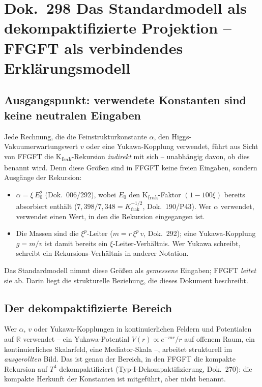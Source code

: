 
\section*{Dok.~298 \quad Das Standardmodell als dekompaktifizierte
Projektion -- FFGFT als verbindendes Erklärungsmodell}

\subsection*{Ausgangspunkt: verwendete Konstanten sind keine neutralen Eingaben}

Jede Rechnung, die die Feinstrukturkonstante $\alpha$, den Higgs-Vakuumerwartungswert
$v$ oder eine Yukawa-Kopplung verwendet, führt aus Sicht von FFGFT die
K\textsubscript{frak}-Rekursion \emph{indirekt} mit sich -- unabhängig davon,
ob dies benannt wird. Denn diese Größen sind in FFGFT keine freien Eingaben,
sondern Ausgänge der Rekursion:

\begin{itemize}
  \item $\alpha = \xi\,E_0^2$ (Dok.~006/292), wobei $E_0$ den
    K\textsubscript{frak}-Faktor $(1-100\xi)$ bereits absorbiert enthält
    ($7{,}398/7{,}348 = K_{\text{frak}}^{-1/2}$, Dok.~190/P43). Wer $\alpha$
    verwendet, verwendet einen Wert, in den die Rekursion eingegangen ist.
  \item Die Massen sind die $\xi^p$-Leiter ($m = r\,\xi^p\,v$, Dok.~292); eine
    Yukawa-Kopplung $g = m/v$ ist damit bereits ein $\xi$-Leiter-Verhältnis.
    Wer Yukawa schreibt, schreibt ein Rekursions-Verhältnis in anderer
    Notation.
\end{itemize}

Das Standardmodell nimmt diese Größen als \emph{gemessene} Eingaben; FFGFT
\emph{leitet} sie ab. Darin liegt die strukturelle Beziehung, die dieses
Dokument beschreibt.

\subsection*{Der dekompaktifizierte Bereich}

Wer $\alpha$, $v$ oder Yukawa-Kopplungen in kontinuierlichen Feldern und
Potentialen auf $\mathbb{R}$ verwendet -- ein Yukawa-Potential $V(r) \propto
e^{-mr}/r$ auf offenem Raum, ein kontinuierliches Skalarfeld, eine
Mediator-Skala --, arbeitet strukturell im \emph{ausgerollten} Bild. Das ist
genau der Bereich, in den FFGFT die kompakte Rekursion auf $T^4$
dekompaktifiziert (Typ-I-Dekompaktifizierung, Dok.~270): die kompakte
Herkunft der Konstanten ist mitgeführt, aber nicht benannt.

